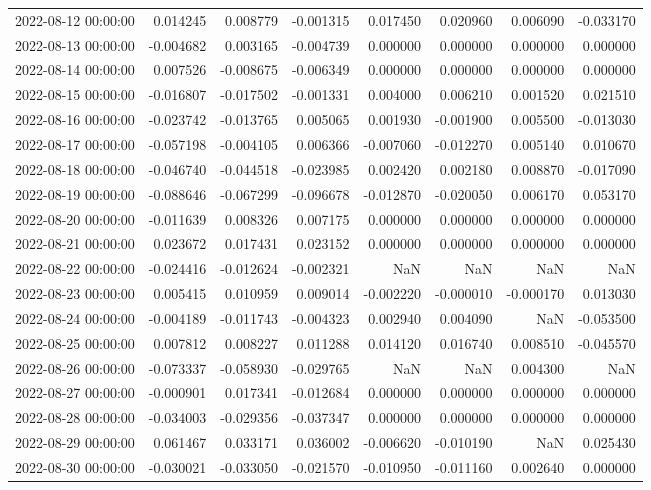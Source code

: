 \begin{tabular}{lrrrrrrr}
2022-08-12 00:00:00 & 0.014245 & 0.008779 & -0.001315 & 0.017450 & 0.020960 & 0.006090 & -0.033170 \\
2022-08-13 00:00:00 & -0.004682 & 0.003165 & -0.004739 & 0.000000 & 0.000000 & 0.000000 & 0.000000 \\
2022-08-14 00:00:00 & 0.007526 & -0.008675 & -0.006349 & 0.000000 & 0.000000 & 0.000000 & 0.000000 \\
2022-08-15 00:00:00 & -0.016807 & -0.017502 & -0.001331 & 0.004000 & 0.006210 & 0.001520 & 0.021510 \\
2022-08-16 00:00:00 & -0.023742 & -0.013765 & 0.005065 & 0.001930 & -0.001900 & 0.005500 & -0.013030 \\
2022-08-17 00:00:00 & -0.057198 & -0.004105 & 0.006366 & -0.007060 & -0.012270 & 0.005140 & 0.010670 \\
2022-08-18 00:00:00 & -0.046740 & -0.044518 & -0.023985 & 0.002420 & 0.002180 & 0.008870 & -0.017090 \\
2022-08-19 00:00:00 & -0.088646 & -0.067299 & -0.096678 & -0.012870 & -0.020050 & 0.006170 & 0.053170 \\
2022-08-20 00:00:00 & -0.011639 & 0.008326 & 0.007175 & 0.000000 & 0.000000 & 0.000000 & 0.000000 \\
2022-08-21 00:00:00 & 0.023672 & 0.017431 & 0.023152 & 0.000000 & 0.000000 & 0.000000 & 0.000000 \\
2022-08-22 00:00:00 & -0.024416 & -0.012624 & -0.002321 & NaN & NaN & NaN & NaN \\
2022-08-23 00:00:00 & 0.005415 & 0.010959 & 0.009014 & -0.002220 & -0.000010 & -0.000170 & 0.013030 \\
2022-08-24 00:00:00 & -0.004189 & -0.011743 & -0.004323 & 0.002940 & 0.004090 & NaN & -0.053500 \\
2022-08-25 00:00:00 & 0.007812 & 0.008227 & 0.011288 & 0.014120 & 0.016740 & 0.008510 & -0.045570 \\
2022-08-26 00:00:00 & -0.073337 & -0.058930 & -0.029765 & NaN & NaN & 0.004300 & NaN \\
2022-08-27 00:00:00 & -0.000901 & 0.017341 & -0.012684 & 0.000000 & 0.000000 & 0.000000 & 0.000000 \\
2022-08-28 00:00:00 & -0.034003 & -0.029356 & -0.037347 & 0.000000 & 0.000000 & 0.000000 & 0.000000 \\
2022-08-29 00:00:00 & 0.061467 & 0.033171 & 0.036002 & -0.006620 & -0.010190 & NaN & 0.025430 \\
2022-08-30 00:00:00 & -0.030021 & -0.033050 & -0.021570 & -0.010950 & -0.011160 & 0.002640 & 0.000000 \\

\end{tabular}

